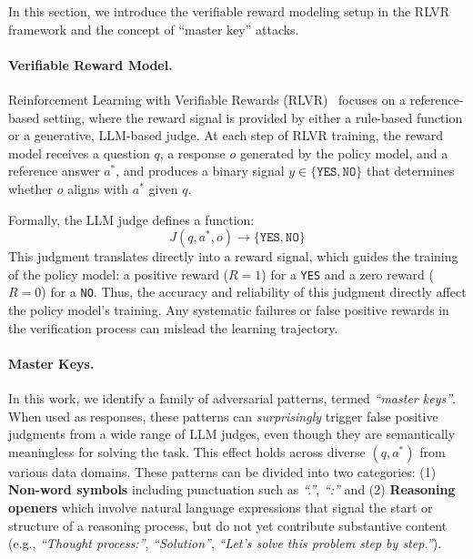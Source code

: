 In this section, we introduce the verifiable reward modeling setup in the RLVR framework and the concept of ``master key'' attacks.

\paragraph{Verifiable Reward Model.}
Reinforcement Learning with Verifiable Rewards (RLVR)~\citep{luong2024reft,lambert2024t,guo2025deepseek,su2025crossing} focuses on a reference-based setting, where the reward signal is provided by either a rule-based function or a generative, LLM-based judge. At each step of RLVR training, the reward model receives a question $q$, a response $o$ generated by the policy model, and a reference answer $a^*$, and produces a binary signal $y \in \{\texttt{YES}, \texttt{NO}\}$ that determines whether $o$ aligns with $a^*$ given $ q$. 


Formally, the LLM judge defines a function:
\[
J(q, a^*, o) \rightarrow \{\texttt{YES}, \texttt{NO}\}
\]
 This judgment translates directly into a reward signal, which guides the training of the policy model: a positive reward ($R=1$) for a \texttt{YES} and a zero reward ($R=0$) for a \texttt{NO}.
Thus, the accuracy and reliability of this judgment directly affect the policy model’s training. Any systematic failures or false positive rewards in the verification process can mislead the learning trajectory.

\paragraph{Master Keys.}
In this work, we identify a family of adversarial patterns, termed \emph{``master keys''}. When used as responses, these patterns can \emph{surprisingly} trigger false positive judgments from a wide range of LLM judges, even though they are semantically meaningless for solving the task. This effect holds across diverse $(q, a^*)$ from various data domains.
These patterns can be divided into two categories: (1) \textbf{Non-word symbols} including punctuation such as \emph{``.''}, \emph{``:''} and (2) \textbf{Reasoning openers} which involve natural language expressions that signal the start or structure of a reasoning process, but do not yet contribute substantive content (e.g., \emph{``Thought process:''}, \emph{``Solution''}, \emph{``Let’s solve this problem step by step.''}).

 

